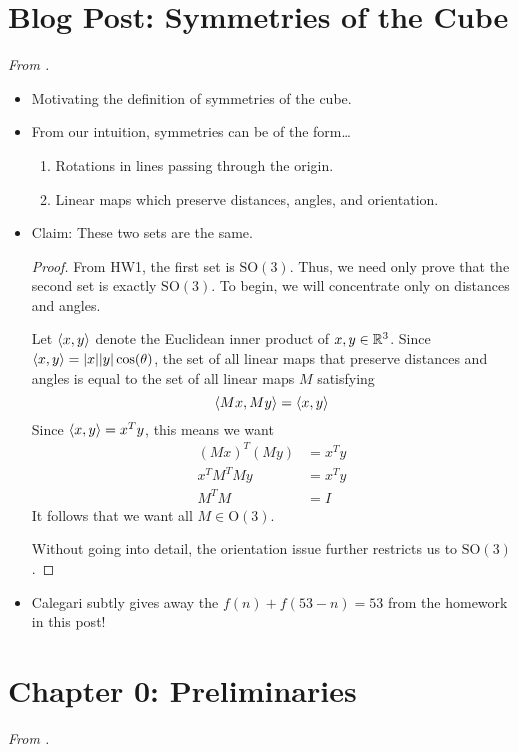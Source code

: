 \documentclass[../notes.tex]{subfiles}
\begin{document}
\section{Blog Post: Symmetries of the Cube}
\emph{From \textcite{bib:Calegari}.}
\begin{itemize}
    \item {}Motivating the definition of symmetries of the cube.
    \item From our intuition, symmetries can be of the form\dots
    \begin{enumerate}
        \item Rotations in lines passing through the origin.
        \item Linear maps which preserve distances, angles, and orientation.
    \end{enumerate}
    \item Claim: These two sets are the same.
    \begin{proof}
        From HW1, the first set is $\text{SO}(3)$. Thus, we need only prove that the second set is exactly $\text{SO}(3)$. To begin, we will concentrate only on distances and angles.\par
        Let $\left\langle{x},{y}\right\rangle$ denote the Euclidean inner product of $x,y\in\mathbb{R}^3$. Since $\left\langle{x},{y}\right\rangle=|x||y|\cos(\theta)$, the set of all linear maps that preserve distances and angles is equal to the set of all linear maps $M$ satisfying
        \begin{equation*}
            \left\langle{Mx},{My}\right\rangle = \left\langle{x},{y}\right\rangle
        \end{equation*}
        Since $\left\langle{x},{y}\right\rangle=x^Ty$, this means we want
        \begin{align*}
            (Mx)^T(My) &= x^Ty\\
            x^TM^TMy &= x^Ty\\
            M^TM &= I
        \end{align*}
        It follows that we want all $M\in\text{O}(3)$.\par
        Without going into detail, the orientation issue further restricts us to $\text{SO}(3)$.
    \end{proof}
    \item Calegari subtly gives away the $f(n)+f(53-n)=53$ from the homework in this post!
\end{itemize}



\section{Chapter 0: Preliminaries}
\emph{From \textcite{bib:DummitFoote}.}
\end{document}
